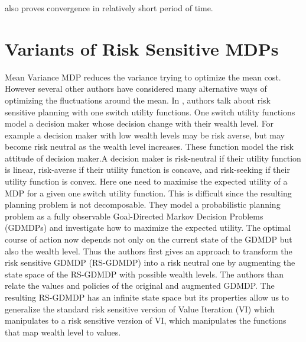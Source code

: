 \documentclass[12pt,a4paper,oneside]{report}
\begin{document}
also proves convergence in relatively short period of time.\\

\section{Variants of Risk Sensitive MDPs}
Mean Variance MDP reduces the variance trying to optimize the mean cost. However several other authors have considered many alternative ways of optimizing the fluctuations around the mean.
In \cite{liu2005risk}, authors talk about risk sensitive planning with one switch utility functions. One switch utility functions model a decision maker whose decision change with their wealth level. For example a decision maker with low wealth levels may be risk averse, but may become risk neutral as the wealth level increases. These function model the risk attitude of decision maker.A decision maker is risk-neutral if their utility function is linear, risk-averse if their utility function is concave, and risk-seeking if their utility function is convex. Here one need to maximise the expected utility of a MDP for a given one switch utility function. This is difficult since the resulting planning problem is not decomposable. They model a probabilistic planning problem as a fully observable Goal-Directed Markov Decision Problems (GDMDPs) and investigate how to maximize the expected utility. The optimal course of action now depends not only on the current state of the GDMDP but also the wealth level. Thus the authors first gives an approach to transform the risk sensitive GDMDP (RS-GDMDP) into a risk neutral one by augmenting the state space of the RS-GDMDP with possible wealth levels. The authors than relate the values and policies of the original and augmented GDMDP.  The resulting RS-GDMDP has an infinite state space but its properties allow us to generalize the standard risk sensitive version of Value Iteration (VI) which manipulates to a risk sensitive version of VI, which manipulates the functions that map wealth level to values.\\
\end{document}

